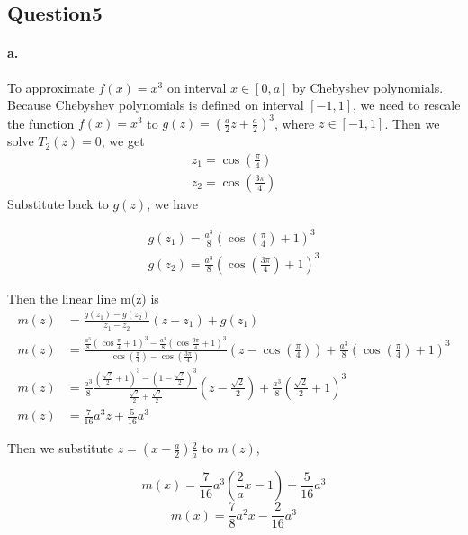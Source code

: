 \documentclass{article}
\begin{document}
\subsection*{Question5}
\paragraph{a.} To approximate $f(x) = x^3$ on interval $x \in [0,a]$ by Chebyshev polynomials.
Because Chebyshev polynomials is defined on interval $[-1, 1]$,
we need to rescale the function $f(x) = x^3$ to $g(z) = (\frac{a}{2}z+\frac{a}{2})^3$, where $z \in [-1,1]$.
Then we solve $T_2(z) = 0$, we get
\begin{equation}
  \begin{split}
    z_1 = \cos (\frac{\pi}{4})\\
    z_2 = \cos (\frac{3\pi}{4})
  \end{split}
\end{equation}
Substitute back to $g(z)$, we have

\begin{equation}
  \begin{split}
    g(z_1) = \frac{a^3}{8} (\cos (\frac{\pi}{4}) +1 )^3\\
    g(z_2) = \frac{a^3}{8} (\cos (\frac{3\pi}{4}) +1 )^3
  \end{split}
\end{equation}

Then the linear line m(z) is
\begin{equation}
  \begin{split}
    m(z) &= \frac{g(z_1)-g(z_2)}{z_1 - z_2} (z - z_1) + g(z_1)\\
    m(z) &= \frac{\frac{a^3}{8} (\cos \frac{\pi}{4} +1 )^3-\frac{a^3}{8} (\cos \frac{3\pi}{4} +1 )^3}{\cos (\frac{\pi}{4}) - \cos (\frac{3\pi}{4})} (z - \cos (\frac{\pi}{4})) + \frac{a^3}{8} (\cos (\frac{\pi}{4}) +1 )^3\\
    m(z) &= \frac{a^3}{8} \frac{(\frac{\sqrt{2}}{2} +1 )^3- (1 -\frac{\sqrt{2}}{2} )^3}{\frac{\sqrt{2}}{2} + \frac{\sqrt{2}}{2} } (z - \frac{\sqrt{2}}{2}) + \frac{a^3}{8} (\frac{\sqrt{2}}{2} +1 )^3\\
    m(z) &= \frac{7}{16} a^3 z + \frac{5}{16} a^3
  \end{split}
\end{equation}

Then we substitute $z = (x - \frac{a}{2}) \frac{2}{a}$ to $m(z)$,

$$m(x) = \frac{7}{16} a^3 (\frac{2}{a}x - 1)  + \frac{5}{16} a^3$$
$$m(x) = \frac{7}{8} a^2 x  - \frac{2}{16} a^3 $$
\end{document}
